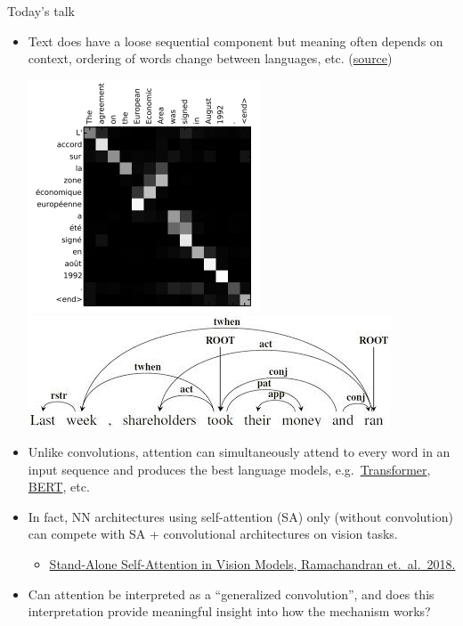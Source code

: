 \documentclass[9pt]{beamer}
\begin{document}
\begin{frame}{Today's talk}
\begin{itemize}
\item Text does have a loose sequential component but meaning often depends on context, ordering of words change between languages, etc. 
(\href{https://wiki.pathmind.com/attention-mechanism-memory-network}{source})
\begin{center}
    \includegraphics[width=.25\textwidth]{presentation/images/attention_translation_grid.png}
    \qquad
    \includegraphics[width=.5\textwidth]{presentation/images/semantic_dependencies.jpg}
\end{center}

\item Unlike convolutions, attention can simultaneously attend to every word in an input sequence and produces the best language models, e.g.\ 
\href{https://papers.nips.cc/paper/2017/file/3f5ee243547dee91fbd053c1c4a845aa-Paper.pdf}{Transformer}, \href{https://arxiv.org/abs/1810.04805}{BERT}, etc.

\item In fact, NN architectures using self-attention (SA) only (without convolution) can compete with SA + convolutional architectures on vision tasks.
\begin{itemize}
    \item \href{https://arxiv.org/abs/1906.05909}{Stand-Alone Self-Attention in Vision Models, Ramachandran et.\ al.\, 2018.}
\end{itemize}

\item Can attention be interpreted as a ``generalized convolution'', and does this interpretation provide meaningful insight into how the mechanism works?
\end{itemize}
\end{frame}
\end{document}

